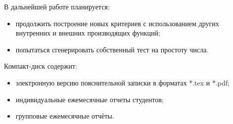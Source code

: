 \documentclass[
russian,
cp1251,
14pt,
simple
]{eskdtext}
\theoremstyle{definition}
\begin{document}
В дальнейшей работе планируется:
\begin{itemize}
\item продолжить построение новых критериев с использованием других внутренних и внешних производящих функций;
\item попытаться сгенерировать собственный тест на простоту числа.
\end{itemize}

\newpage
\renewcommand{\refname}{Список использованных источников}


Компакт-диск содержит: 
\begin{itemize}
\item электронную версию пояснительной записки в форматах *.tex и *.pdf;
\item индивидуальные ежемесячные отчеты студентов;
\item групповые ежемесячные отчёты.
\end{itemize}
\end{document}
